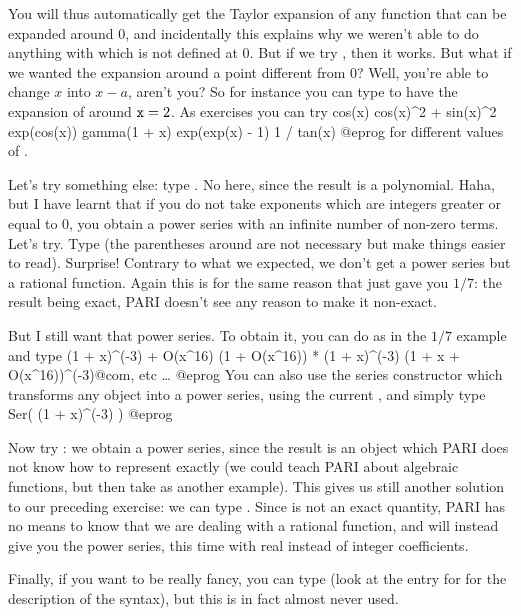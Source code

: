 You will thus automatically get the Taylor expansion of any function that can
be expanded around $0$, and incidentally this explains why we weren't
able to do anything with  which is not defined at 0. But if we
try , then it works. But what if we wanted the expansion
around a point different from 0? Well, you're able to change $x$ into
$x-a$, aren't you? So for instance you can type  to
have the expansion of  around ${\tt x}=2$. As exercises you can
try
\bprog
cos(x)           cos(x)^2 + sin(x)^2           exp(cos(x))
gamma(1 + x)     exp(exp(x) - 1)               1 / tan(x)
@eprog
for different values of .

Let's try something else: type . No  here, since
the result is a polynomial.  Haha, but I have learnt that if you do not take
exponents which are integers greater or equal to 0, you obtain a power series
with an infinite number of non-zero terms. Let's try.  Type
 (the parentheses around  are not necessary but
make things easier to read). Surprise! Contrary to what we expected, we don't
get a power series but a rational function. Again this is for the same reason
that  just gave you $1/7$: the result being exact, PARI doesn't see
any reason to make it non-exact.

But I still want that power series. To obtain it, you can do as in the $1/7$
example and type
\bprog
(1 + x)^(-3) + O(x^16)
(1 + O(x^16)) * (1 + x)^(-3)
(1 + x + O(x^16))^(-3)@com, etc \dots
@eprog
You can also use the series constructor which transforms any object into a
power series, using the current , and simply type
\bprog
Ser( (1 + x)^(-3) )
@eprog

Now try : we obtain a power series, since the
result is an object which PARI does not know how to represent exactly (we
could teach PARI about algebraic functions, but then take 
as another example). This gives us still another solution to our preceding
exercise: we can type . Since  is not an exact
quantity, PARI has no means to know that we are dealing with a rational
function, and will instead give you the power series, this time with real
instead of integer coefficients.

Finally, if you want to be really fancy, you can type
 (look at the entry for  for the
description of the syntax), but this is in fact almost never used.
\smallskip

